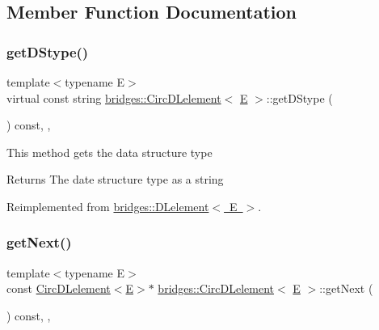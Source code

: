 \subsection{Member Function Documentation}
\mbox{\label{classbridges_1_1_circ_d_lelement_a0e199fe681755df694807261ce2460c2}} 
\subsubsection{\texorpdfstring{getDStype()}{getDStype()}}
{\footnotesize\ttfamily template$<$typename E$>$ \\
virtual const string \mbox{\hyperlink{classbridges_1_1_circ_d_lelement}{bridges\+::\+Circ\+D\+Lelement}}$<$ \mbox{\hyperlink{namespacebridges_acfb0a4f7877d8f63de3e6862004c50eda3a3ea00cfc35332cedf6e5e9a32e94da}{E}} $>$\+::get\+D\+Stype (\begin{DoxyParamCaption}{ }\end{DoxyParamCaption}) const\hspace{0.3cm}{\ttfamily [inline]}, {\ttfamily [override]}, {\ttfamily [virtual]}}

This method gets the data structure type

\begin{DoxyReturn}{Returns}
The date structure type as a string 
\end{DoxyReturn}


Reimplemented from \mbox{\hyperlink{classbridges_1_1_d_lelement_a109be7aba8bd3d0450859938b5d3144c}{bridges\+::\+D\+Lelement$<$ E $>$}}.

\mbox{\label{classbridges_1_1_circ_d_lelement_ac266d60bd2f7ce92cb38a12875a6a468}} 
\subsubsection{\texorpdfstring{getNext()}{getNext()}\hspace{0.1cm}{\footnotesize\ttfamily [1/2]}}
{\footnotesize\ttfamily template$<$typename E$>$ \\
const \mbox{\hyperlink{classbridges_1_1_circ_d_lelement}{Circ\+D\+Lelement}}$<$\mbox{\hyperlink{namespacebridges_acfb0a4f7877d8f63de3e6862004c50eda3a3ea00cfc35332cedf6e5e9a32e94da}{E}}$>$$\ast$ \mbox{\hyperlink{classbridges_1_1_circ_d_lelement}{bridges\+::\+Circ\+D\+Lelement}}$<$ \mbox{\hyperlink{namespacebridges_acfb0a4f7877d8f63de3e6862004c50eda3a3ea00cfc35332cedf6e5e9a32e94da}{E}} $>$\+::get\+Next (\begin{DoxyParamCaption}{ }\end{DoxyParamCaption}) const\hspace{0.3cm}{\ttfamily [inline]}, {\ttfamily [override]}, {\ttfamily [virtual]}}

